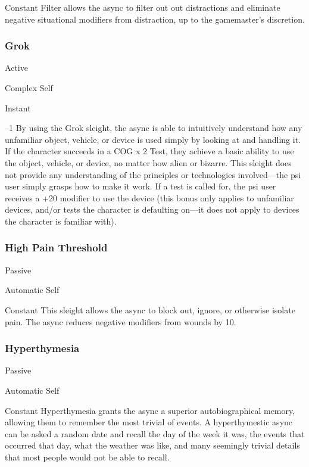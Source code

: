    Constant
Filter allows the async to filter out out distractions 
and eliminate negative situational modifiers from 
distraction, up to the gamemaster's discretion.

\subsubsection{Grok}

  

Active

   Complex
 Self

   Instant

   –1
By using the Grok sleight, the async is able to 
intuitively understand how any unfamiliar object, 
vehicle, or device is used simply by looking at and 
handling it. If the character succeeds in a COG x 2 
Test, they achieve a basic ability to use the object, 
vehicle, or device, no matter how alien or bizarre. 
This sleight does not provide any understanding of 
the principles or technologies involved—the psi user 
simply grasps how to make it work. If a test is called 
for, the psi user receives a +20 modifier to use the 
device (this bonus only applies to unfamiliar devices, 
and/or tests the character is defaulting on—it does not 
apply to devices the character is familiar with).

\subsubsection{High Pain Threshold}


  

Passive

   Automatic
 Self

   Constant
This sleight allows the async to block out, ignore, or 
otherwise isolate pain. The async reduces negative 
modifiers from wounds by 10.

\subsubsection{Hyperthymesia}


  

Passive

   Automatic
 Self

   Constant
Hyperthymesia grants the async a superior autobiographical
memory, allowing them to remember the
most trivial of events. A hyperthymestic async can be 
asked a random date and recall the day of the week 
it was, the events that occurred that day, what the 
weather was like, and many seemingly trivial details 
that most people would not be able to recall.

